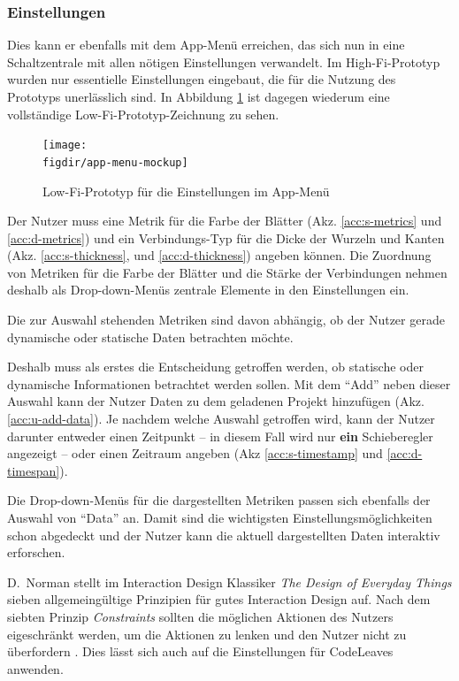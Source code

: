 \subsubsection*{Einstellungen}

Dies kann er ebenfalls mit dem App-Menü erreichen, das sich nun in eine Schaltzentrale mit allen nötigen Einstellungen verwandelt. Im High-Fi-Prototyp wurden nur essentielle Einstellungen eingebaut, die für die Nutzung des Prototyps unerlässlich sind. In Abbildung \ref{fig:settings} ist dagegen wiederum eine vollständige Low-Fi-Prototyp-Zeichnung zu sehen.

\begin{figure}[htb]
  \texttt{[image: \\figdir/app-menu-mockup]}
  \caption{Low-Fi-Prototyp für die Einstellungen im App-Menü}
  \label{fig:settings}
\end{figure}

Der Nutzer muss eine Metrik für die Farbe der Blätter (Akz. \ref{acc:s-metrics} und \ref{acc:d-metrics}) und ein Verbindungs-Typ für die Dicke der Wurzeln und Kanten (Akz. \ref{acc:s-thickness},  und \ref{acc:d-thickness}) angeben können. Die Zuordnung von Metriken für die Farbe der Blätter und die Stärke der Verbindungen nehmen deshalb als Drop-down-Menüs zentrale Elemente in den Einstellungen ein.

Die zur Auswahl stehenden Metriken sind davon abhängig, ob der Nutzer gerade dynamische oder statische Daten betrachten möchte.

Deshalb muss als erstes die Entscheidung getroffen werden, ob statische oder dynamische Informationen betrachtet werden sollen. Mit dem "`Add"' neben dieser Auswahl kann der Nutzer Daten zu dem geladenen Projekt hinzufügen (Akz. \ref{acc:u-add-data}). Je nachdem welche Auswahl getroffen wird, kann der Nutzer darunter entweder einen Zeitpunkt -- in diesem Fall wird nur \textbf{ein} Schieberegler angezeigt -- oder einen Zeitraum angeben (Akz \ref{acc:s-timestamp} und \ref{acc:d-timespan}).

Die Drop-down-Menüs für die dargestellten Metriken passen sich ebenfalls der Auswahl von "`Data"' an. Damit sind die wichtigsten Einstellungsmöglichkeiten schon abgedeckt und der Nutzer kann die aktuell dargestellten Daten interaktiv erforschen.

D.\ Norman stellt im Interaction Design Klassiker \textit{The Design of Everyday Things} sieben allgemeingültige Prinzipien für gutes Interaction Design auf. Nach dem siebten Prinzip \textit{Constraints} sollten die möglichen Aktionen des Nutzers eigeschränkt werden, um die Aktionen zu lenken und den Nutzer nicht zu überfordern \cite{norman2013design}. Dies lässt sich auch auf die Einstellungen für CodeLeaves anwenden.

